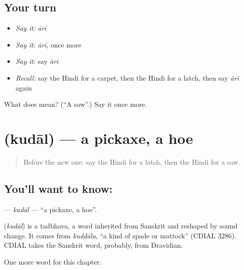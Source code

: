 \subsection*{Your turn}
\begin{itemize}
\raggedright
  \item \emph{Say it:} \emph{ārī}
  \item \emph{Say it:} \emph{ārī}, once more
  \item \emph{Say it:} say \emph{ārī}
  \item \emph{Recall:} say the Hindi for a carpet, then the Hindi for a latch, then say \emph{ārī} again
\end{itemize}

\begin{tcolorbox}[breakable,colback=teal!4,colframe=teal!35!black,title={Before you move on}]
What does  mean? (\textquotedblleft{}A saw\textquotedblright{}.) Say it once more.
\end{tcolorbox}
\section[\texorpdfstring{\hi{कुदाल} (kudāl)}{कुदाल (kudāl)}]{ (kudāl) — a pickaxe, a hoe}

\label{lesson:HI-C266-kudal}



\begin{quote}
Before the new one: say the Hindi for a latch, then the Hindi for a saw.
\end{quote}

\subsection*{You'll want to know: }
\textbf{} — \emph{kudāl} — \textquotedblleft{}a pickaxe, a hoe\textquotedblright{}.

\begin{cousinweb}
\textbf{} (\emph{kudāl}) is a tadbhava, a word inherited from Sanskrit and reshaped by sound change. It comes from \emph{kuddāla}, \textquotedblleft{}a kind of spade or mattock\textquotedblright{} (CDIAL 3286). CDIAL takes the Sanskrit word, probably, from Dravidian.
\end{cousinweb}

\begin{grammarlens}[title={What you've built}]
One more word for this chapter.
\end{grammarlens}

